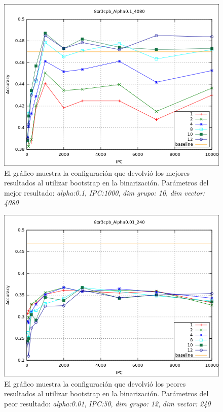 			\begin{figure}[htbp]
				\centering
				\includegraphics[scale=0.6]{img/resultados/sinteticas/best_bootstrap_8or3cpb_Alpha0,1_4080.png}
				\caption[Sintéticas bootstrap mejor resultado]{El gráfico muestra la configuración que devolvió los mejores resultados al utilizar bootstrap en la binarización. Parámetros del mejor resultado: \textit{alpha:0.1}, \textit{IPC:1000}, \textit{dim grupo: 10}, \textit{dim vector: 4080}}
				\label{fig: Sinteticas-bootstrap-mejor}
			\end{figure}
	
			\begin{figure}[htbp]
				\centering
				\includegraphics[scale=0.6]{img/resultados/sinteticas/worst_bootstrap_8or3cpb_Alpha0,01_240.png}
				\caption[Sintéticas bootstrap peor resultado]{El gráfico muestra la configuración que devolvió los peores resultados al utilizar bootstrap en la binarización. Parámetros del peor resultado: \textit{alpha:0.01}, \textit{IPC:50}, \textit{dim grupo: 12}, \textit{dim vector: 240}}
				\label{fig: Sinteticas-bootstrap-bajo}
			\end{figure}
			
